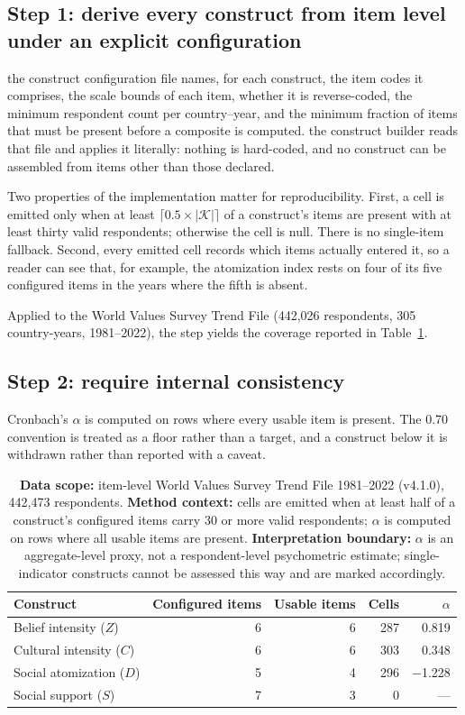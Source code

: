 \documentclass[11pt]{article}
\newcommand{\TableStyle}{%
    \small
    \setlength{\tabcolsep}{2pt}%
    \renewcommand{\arraystretch}{0.9}%
}
\begin{document}
\subsection*{Step 1: derive every construct from item level under an explicit configuration}
the construct configuration file names, for each construct, the item codes it comprises, the scale bounds of each item, whether it is reverse-coded, the minimum respondent count per country--year, and the minimum fraction of items that must be present before a composite is computed. the construct builder reads that file and applies it literally: nothing is hard-coded, and no construct can be assembled from items other than those declared.

Two properties of the implementation matter for reproducibility. First, a cell is emitted only when at least $\lceil 0.5 \times |\mathcal{K}| \rceil$ of a construct's items are present with at least thirty valid respondents; otherwise the cell is null. There is no single-item fallback. Second, every emitted cell records which items actually entered it, so a reader can see that, for example, the atomization index rests on four of its five configured items in the years where the fifth is absent.

Applied to the World Values Survey Trend File (442{,}026 respondents, 305 country-years, 1981--2022), the step yields the coverage reported in Table~\ref{tab:construct-audit}.

\subsection*{Step 2: require internal consistency}
Cronbach's $\alpha$ is computed on rows where every usable item is present. The 0.70 convention is treated as a floor rather than a target, and a construct below it is withdrawn rather than reported with a caveat.

\begin{table}[!htbp]
\centering
\TableStyle
\caption{\textbf{Data scope:} item-level World Values Survey Trend File 1981--2022 (v4.1.0), 442{,}473 respondents. \textbf{Method context:} cells are emitted when at least half of a construct's configured items carry 30 or more valid respondents; $\alpha$ is computed on rows where all usable items are present. \textbf{Interpretation boundary:} $\alpha$ is an aggregate-level proxy, not a respondent-level psychometric estimate; single-indicator constructs cannot be assessed this way and are marked accordingly.}
\label{tab:construct-audit}
\begin{tabularx}{\linewidth}{@{}lrrrr@{}}
\toprule
Construct & Configured items & Usable items & Cells & $\alpha$ \\
\midrule
Belief intensity ($Z$)      & 6 & 6 & 287 & \num{+0.819} \\
Cultural intensity ($C$)    & 6 & 6 & 303 & \num{+0.348} \\
Social atomization ($D$)    & 5 & 4 & 296 & \num{-1.228} \\
Social support ($S$)        & 7 & 3 & 0   & --- \\
\bottomrule
\end{tabularx}
\end{table}
\end{document}
